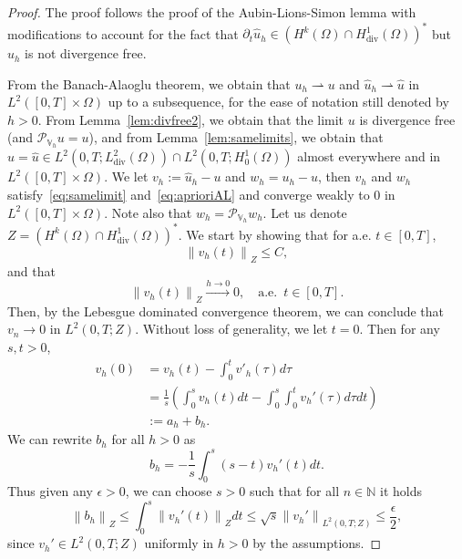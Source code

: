 \documentclass[10pt,letterpaper]{amsart}
\newcommand{\N}{\mathbb{N}}
\newcommand{\hu}{\widehat{u}}
\newcommand\norm[1]{\left\lVert#1\right\rVert}
\newcommand{\Div}{\operatorname{div}}
\newcommand{\dom}{\Omega}
\newcommand{\Vh}{\mathbb{V}_h}
\newcommand{\weak}{\rightharpoonup}
\newcommand{\PVh}{\mathcal{P}_{\Vh}}
\theoremstyle{definition}{\newtheorem{definition}[lemma]{Definition}}
\numberwithin{equation}{section}
\begin{document}
\begin{proof}
	The proof follows the proof of the Aubin-Lions-Simon lemma with modifications to account for the fact that $\partial_t \hu_h\in (H^k(\dom)\cap H^1_{\Div}(\dom))^*$ but $\hu_h$ is not divergence free.
	
	From the Banach-Alaoglu theorem, we obtain that $u_h\weak u$ and $\hu_h\weak \hu$ in $L^2([0,T]\times\dom)$ up to a subsequence, for the ease of notation still denoted by $h>0$. From Lemma~\ref{lem:divfree2}, we obtain that the limit $u$ is divergence free (and $\PVh u =u$), and from Lemma~\ref{lem:samelimits}, we obtain that $u=\hu\in L^2(0,T;L^2_{\Div}(\dom))\cap L^2(0,T;H^1_0(\dom))$ almost everywhere and in $L^2([0,T]\times\dom)$. We let $v_h:=\hu_h-u$ and $w_h=u_h-u$, then $v_h$ and $w_h$ satisfy~\eqref{eq:samelimit} and~\eqref{eq:aprioriAL} and converge weakly to $0$ in $L^2([0,T]\times\dom)$. Note also that $w_h = \PVh w_h$.
	Let us denote $Z =  (H^k(\dom)\cap H^1_{\Div}(\dom))^*$. We start by showing that for a.e. $t\in [0,T]$,
		\begin{equation}\label{eq:uniformZ}
		\norm{v_h(t)}_{Z}\leq C,
	\end{equation}
	and that
	\begin{equation}\label{eq:aeliminZ}
		\norm{v_h(t)}_Z \stackrel{h\to 0}{\longrightarrow} 0,\quad \text{a.e. }\, t\in [0,T].
	\end{equation}
	Then, by the Lebesgue dominated convergence theorem, 
	we can conclude that $v_n\to 0$ in $L^2(0,T;Z)$. Without loss of generality, we let $t=0$. Then for any $s,t>0$,
	\begin{equation*}
		\begin{split}
			v_h(0)&= v_h(t)-\int_0^t v'_h(\tau)d\tau\\
			& = \frac{1}{s}\left(\int_0^s v_h(t)dt -\int_0^s \int_0^t v_h'(\tau)d\tau dt\right)\\
			&:= a_h + b_h.	
	\end{split}\end{equation*}
	We can rewrite $b_h$ for all $h>0$ as
	\begin{equation*}
		b_h = -\frac{1}{s}\int_0^s (s-t) v_h'(t)dt.
	\end{equation*}
	Thus given any $\epsilon>0$, we can choose $s>0$ such that for all $n\in\N$ it holds
	\begin{equation*}
		\norm{b_h}_{Z}\leq \int_0^s \norm{v_h'(t)}_{Z} dt\leq \sqrt{s}\norm{v_h'}_{L^2(0,T;Z)} \leq \frac{\epsilon}{2},
	\end{equation*}
	since $v_h'\in L^2(0,T;Z)$ uniformly in $h>0$ by the assumptions.

\end{proof}
\end{document}
